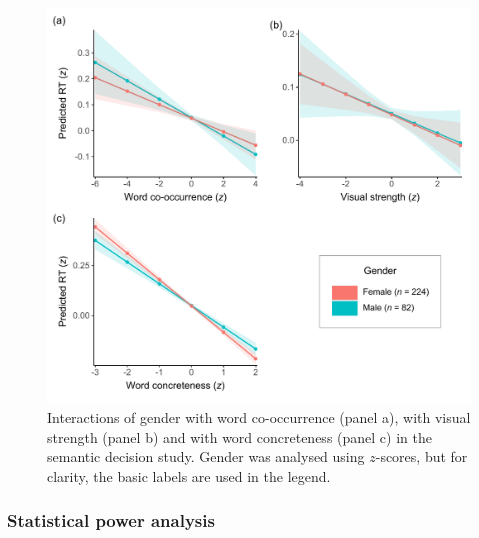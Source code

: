 \documentclass[
  12pt,
  man,floatsintext]{apa7}
\begin{document}
\begin{figure}

{\centering \includegraphics[width=0.98\linewidth]{../semanticdecision/frequentist_analysis/plots/semanticdecision-interactions-with-gender} 

}

\caption{Interactions of gender with word co-occurrence (panel a), with visual strength (panel b) and with word concreteness (panel c) in the semantic decision study. Gender was analysed using $z$-scores, but for clarity, the basic labels are used in the legend.}\label{fig:semanticdecision-interactions-with-gender}
\end{figure}

\hypertarget{statistical-power-analysis-4}{%
\subsubsection{Statistical power analysis}\label{statistical-power-analysis-4}}
\end{document}
